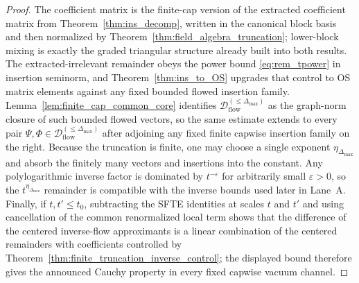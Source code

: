 \begin{proof}
The coefficient matrix is the finite-cap version of the extracted coefficient matrix from Theorem~\ref{thm:ins_decomp}, written in the canonical block basis and then normalized by
Theorem~\ref{thm:field_algebra_truncation}; lower-block mixing is exactly the graded triangular structure already built into both results.
The extracted-irrelevant remainder obeys the power bound \eqref{eq:rem_tpower} in insertion seminorm, and Theorem~\ref{thm:ins_to_OS} upgrades that control to OS matrix elements against any fixed bounded
flowed insertion family.
Lemma~\ref{lem:finite_cap_common_core} identifies $\mathcal D^{(\le \Delta_{\max})}_{\mathrm{flow}}$ as the graph-norm closure of such bounded flowed vectors, so the same estimate extends to every pair
$\Psi,\Phi\in\mathcal D^{(\le \Delta_{\max})}_{\mathrm{flow}}$ after adjoining any fixed finite capwise insertion family on the right.
Because the truncation is finite, one may choose a single exponent $\eta_{\Delta_{\max}}$ and absorb the finitely many vectors and insertions into the constant.
Any polylogarithmic inverse factor is dominated by $t^{-\varepsilon}$ for arbitrarily small $\varepsilon>0$, so the $t^{\eta_{\Delta_{\max}}}$ remainder is compatible with the inverse bounds used later in Lane~A.
Finally, if $t,t'\le t_0$, subtracting the SFTE identities at scales $t$ and $t'$ and using cancellation of the common renormalized local term shows that the difference of the centered inverse-flow approximants is a linear combination of the centered remainders with coefficients controlled by
Theorem~\ref{thm:finite_truncation_inverse_control}; the displayed bound therefore gives the announced Cauchy property in every fixed capwise vacuum channel.


\end{proof}
